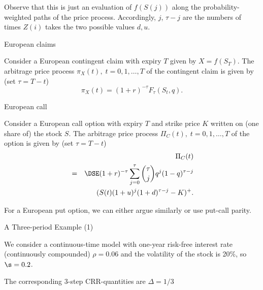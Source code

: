 	Observe that this is just an evaluation of $f(S(j))$ along the
probability-weighted paths of the price process. Accordingly, $j$,
$\tau-j$ are the numbers of times $Z(i)$ takes the two possible
values $d, u$.





{European claims}






	Consider a European contingent claim with expiry $T$ given by
$X=f(S_T)$. The arbitrage price process $\pi_X(t), \; t=0, 1,
\ldots, T$ of the contingent claim is given by (set $\tau=T-t$)
\begin{equation}\label{crrcontclaimprice}
\pi_X(t) = (1+r)^{-\tau} F_\tau(S_t,q).
\end{equation}





{European call}






	Consider a European call option with expiry $T$ and strike price
$K$ written on (one share of) the stock $S$. The arbitrage price
process $\Pi_C(t), \; t=0, 1, \ldots, T$ of the option is given by
(set $\tau=T-t$)
\begin{eqnarray}\label{crrcallprice}
&& \Pi_C(t)\\\nonumber
&=&\DSE (1+r)^{-\tau} \sum_{j=0}^{\tau} {{\tau} \choose j}
{q}^j (1 - q)^{\tau-j}\\\nonumber
&&(S(t) (1+u)^j (1+d)^{\tau-j} - K)^+.
\end{eqnarray}


	For a European put option, we can either argue similarly or use
put-call parity.





{ A Three-period Example (1)}







	We consider a continuous-time model with one-year risk-free interest rate (continuously compounded) $\rho=0.06$ and the volatility of the stock is 20\%, so $\s = 0.2$.


	The corresponding 3-step CRR-quantities are $\Delta =1/3$






